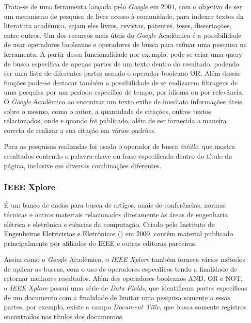Trata-se de uma ferramenta lançada pelo \textit{Google} em 2004, com o objetivo de ser um mecanismo de pesquisa de livre acesso à comunidade, para indexar textos da literatura acadêmica, sejam eles livros, revistas, patentes, teses, dissertações, entre outros. Um dos recursos mais úteis do \textit{Google} Acadêmico é a possibilidade de usar operadores booleanos e operadores de busca para refinar uma pesquisa na ferramenta. A partir dessa funcionalidade por exemplo, pode-se criar uma query de busca específica de apenas partes de um texto dentro do resultado, podendo ser uma lista de diferentes partes usando o operador booleano OR. Além dessas funções pode-se destacar também a possibilidade de se realizarem filtragens de uma pesquisa por um período específico de tempo, por idioma ou por relevância. O \textit{Google} Acadêmico ao encontrar um texto exibe de imediato informações úteis sobre o mesmo, como o autor, a quantidade de citações, outros textos relacionados, onde e quando foi publicado, além de ser fornecida a maneira correta de realizar a sua citação em vários padrões.

Para as pesquisas realizadas foi usado o operador de busca \textit{intitle}, que mostra resultados contendo a palavra-chave ou frase especificada dentro do título da página, inclusive em diversas combinações diferentes.

\subsubsection{IEEE Xplore}

É um banco de dados para busca de artigos, anais de conferências, normas técnicas e outros materiais relacionados diretamente às áreas de engenharia elétrica e eletrônica e ciências da computação. Criado pelo Instituto de Engenheiros Eletricistas e Eletrônicos () em 2000, contém material publicado principalmente por afiliados do IEEE e outras editoras parceiras.

Assim como o \textit{Google} Acadêmico, o \textit{IEEE Xplore} também fornece vários métodos de aplicar as buscas, com o uso de operadores específicos tendo a finalidade de retornar melhores resultados. Além dos operadores booleanos AND, OR e NOT, o \textit{IEEE Xplore} possui uma série de \textit{Data Fields}, que identificam partes específicas de um documento com a finalidade de limitar uma pesquisa somente a essas partes, por exemplo, existe o campo \textit{Document Title}, que busca somente registros encontrados nos títulos dos documentos. 


